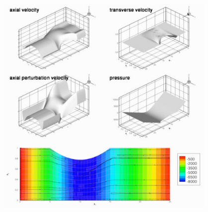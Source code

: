  
\begin{DoxyImage}
\includegraphics[width=0.8\textwidth]{fsi_CR_algebraic_adapt}
\end{DoxyImage}




 

